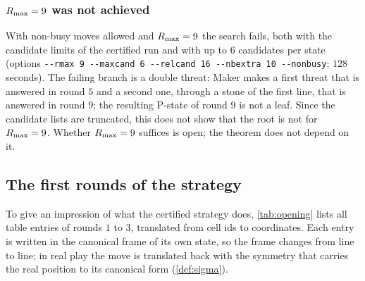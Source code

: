 \subsubsection*{$R_{\max}=9$ was not achieved}
With non-busy moves allowed and $R_{\max}=9$ the search fails, both with the candidate limits of the
certified run and with up to $6$ candidates per state (options \texttt{-{}-rmax 9 -{}-maxcand 6 -{}-relcand 16 -{}-nbextra 10 -{}-nonbusy};
$128$ seconds). The failing branch is a double threat: Maker makes a first threat that is answered in round
$5$ and a second one, through a stone of the first line, that is answered in round $9$; the resulting P-state
of round $9$ is not a leaf. Since the candidate lists are truncated, this does not show that the root is not
\WON{} for $R_{\max}=9$. Whether $R_{\max}=9$ suffices is open; the theorem does not depend on it.

\subsection{The first rounds of the strategy}\label{ssec:walk}

To give an impression of what the certified strategy does, \cref{tab:opening} lists all table entries of
rounds $1$ to $3$, translated from cell ids to coordinates. Each entry is written in the canonical frame of
its own state, so the frame changes from line to line; in real play the move is translated back with the
symmetry that carries the real position to its canonical form (\cref{def:sigma}).

